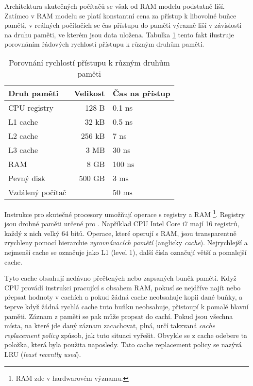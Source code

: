 Architektura skutečných počítačů se však od RAM modelu podstatně liší.
Zatímco v RAM modelu se platí konstantní cena za přístup k libovolné buňce
paměti, v reálných počítačích se čas přístupu do paměti výrazně liší
v závislosti na druhu paměti, ve kterém jsou data uložena.
Tabulka \ref{table:speeds} tento fakt ilustruje porovnáním
řádových rychlostí přístupu k různým druhům paměti.

\begin{table}
	\centering
	\begin{tabular}{l|r|l}
	Druh paměti & Velikost & Čas na přístup \\
	\hline
	CPU registry & 128 B & 0.1 ns \\
	L1 cache & 32 kB & 0.5 ns \\
	L2 cache & 256 kB & 7 ns \\
	L3 cache & 3 MB & 30 ns \\
	RAM & 8 GB & 100 ns \\
	Pevný disk & 500 GB & 3 ms \\
	Vzdálený počítač & -- & 50 ms
	\end{tabular}
	\caption{Porovnání rychlostí přístupu k různým druhům paměti}
	\label{table:speeds}
\end{table}

Instrukce pro skutečné procesory umožňují operace s registry a RAM
\footnote{RAM zde v hardwarovém významu.}.
Registry jsou drobné paměti určené pro . Například CPU
Intel Core i7 mají 16 registrů, každý z nich velký 64 bitů.
Operace, které operují s RAM, jsou transparentně zrychleny pomocí hierarchie
\textit{vyrovnávacích pamětí} (anglicky \textit{cache}).
Nejrychlejší a nejmenší cache se označuje jako L1 (level 1), další čísla
označují větší a pomalejší cache.

Tyto cache obsahují  nedávno přečtených nebo zapsaných buněk
paměti.  Když CPU provádí instrukci pracující s obsahem RAM, pokusí se nejdříve
najít nebo přepsat hodnoty v cachích a pokud žádná cache neobsahuje kopii dané
buňky, a teprve když žádná rychlá cache tuto buňku neobsahuje, přistoupí k
pomalé hlavní paměti. Záznam z paměti se pak může propsat do cachí. Pokud jsou
všechna místa, na které jde daný záznam zacachovat, plná, určí takzvaná
\textsl{cache replacement policy} způsob, jak tuto situaci vyřešit. Obvykle
se z cache odebere ta položka, která byla použita naposledy. Tato cache
replacement policy se nazývá LRU (\textit{least recently used}).

